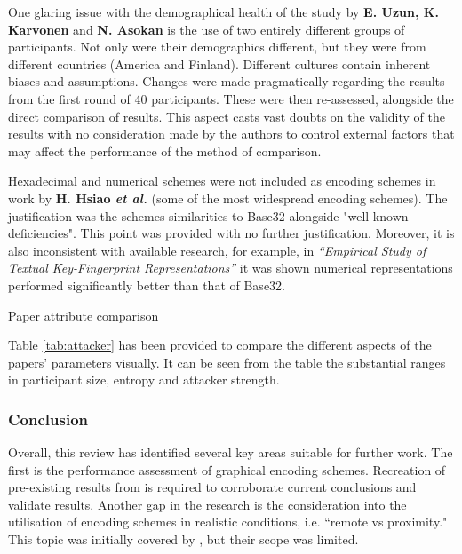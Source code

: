 One glaring issue with the demographical health of the study by \textbf{E. Uzun, K. Karvonen} and \textbf{N. Asokan}\cite{uzun2007usability} is the use of two entirely different groups of participants. Not only were their demographics different, but they were from different countries (America and Finland). Different cultures contain inherent biases and assumptions. Changes were made pragmatically regarding the results from the first round of 40 participants. These were then re-assessed, alongside the direct comparison of results. This aspect casts vast doubts on the validity of the results with no consideration made by the authors to control external factors that may affect the performance of the method of comparison.

Hexadecimal and numerical schemes were not included as encoding schemes in work by \textbf{H. Hsiao \textit{et al.}}\cite{hsiao2009study} (some of the most widespread encoding schemes). The justification was the schemes similarities to Base32  alongside "well-known deficiencies". This point was provided with no further justification. Moreover, it is also inconsistent with available research, for example, in \textit{``Empirical Study of Textual Key-Fingerprint Representations''}\cite{dechand2016empirical} it was shown numerical representations performed significantly better than that of Base32.

\begin{table}[h!]
    \centering
    \resizebox{.8\textwidth}{!}{%
        \makebox[\textwidth][c]{
            
        }%
    }
    \caption{Paper attribute comparison}
    \label{tab:attacker}
\end{table}

Table \ref{tab:attacker} has been provided to compare the different aspects of the papers' parameters visually. It can be seen from the table the substantial ranges in participant size, entropy and attacker strength.

\subsubsection*{Conclusion}
Overall, this review has identified several key areas suitable for further work.
The first is the performance assessment of graphical encoding schemes. Recreation of pre-existing results from \cite{hsiao2009study}\cite{tan2017can} is required to corroborate current conclusions and validate results.
Another gap in the research is the consideration into the utilisation of encoding schemes in realistic conditions, i.e. ``remote vs proximity." This topic was initially covered by \cite{shirvanian2017pitfalls}, but their scope was limited. 

